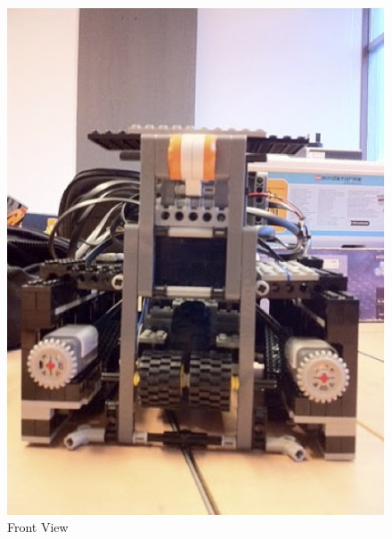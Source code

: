 \documentclass[12pt, a4paper, titlepage]{article}
\begin{document}
\begin{figure}[h]
\begin{minipage}[b]{0.5\linewidth}
\includegraphics[scale=0.8]{images/robot/frontview.jpg}
\caption{Front View}
\label{fig:frontview}
\end{minipage}
\end{figure}
\end{document}

